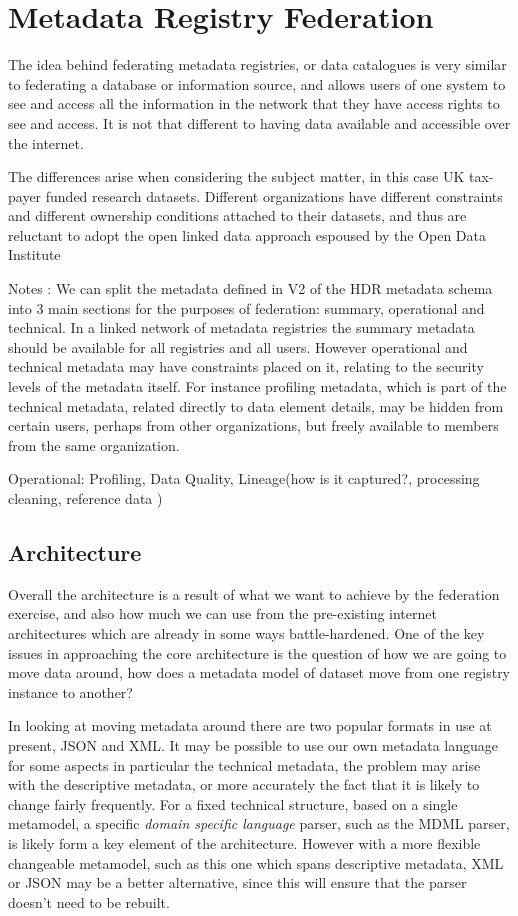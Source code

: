 \documentclass{article}
\begin{document}
\newpage 
\section{Metadata Registry Federation}
		The idea behind federating metadata registries, or data catalogues is very similar to federating a database or information source, and allows users of one system to see and access all the information in the network that they have access rights to see and access.  It is not that different to having data available and accessible over the internet. 
		
		The differences arise when considering the subject matter, in this case UK tax-payer funded research datasets. Different organizations have different constraints and different ownership conditions attached to their datasets, and thus are reluctant to adopt the open linked data approach espoused by the Open Data Institute \cite[ODI]{opendata}
		
		
		Notes :  We can split the metadata defined in V2 of the HDR metadata schema into 3 main sections for the purposes of federation: summary, operational and technical.  In a linked network of metadata registries the summary metadata should be available for all registries and all users. However operational and technical metadata may have constraints placed on it, relating to the security levels of the metadata itself. For instance profiling metadata, which is part of the technical metadata, related directly to data element details, may be hidden from certain users, perhaps from other organizations, but freely available to members from the same organization.
		
		Operational: Profiling, Data Quality, Lineage(how is it captured?, processing cleaning, reference data )
		
	
		
		\subsection{Architecture}
		
		Overall the architecture is a result of what we want to achieve by the federation exercise, and also how much we can use from the pre-existing internet architectures which are already in some ways battle-hardened. One of the key issues in approaching the core architecture is the question of how we are going to move data around, how does a metadata model of dataset move from one registry instance to another? 
		
		In looking at moving metadata around there are two popular formats in use at present, JSON and XML. It may be possible to use our own metadata language for some aspects in particular the technical metadata, the problem may arise with the descriptive metadata, or more accurately the fact that it is likely to change fairly frequently.  For a fixed technical structure, based on a single metamodel, a specific \emph{domain specific language} parser, such as the MDML parser, is likely form a key element of the architecture. However with a more flexible changeable metamodel, such as this one which spans descriptive metadata, XML or JSON may be a better alternative, since this will ensure that the parser doesn't need to be rebuilt.
		
\end{document}
